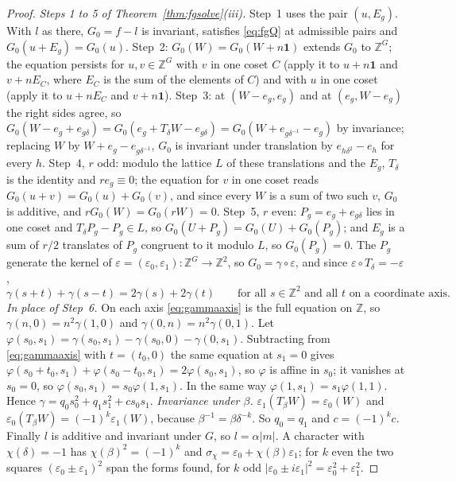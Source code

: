 \begin{proof}
\emph{Steps 1 to 5 of Theorem~\ref{thm:fgsolve}(iii).} Step~1 uses the pair $(u,E_g)$. With $l$ as there, $G_0=f-l$ is invariant, satisfies \eqref{eq:fgQ} at admissible pairs and $G_0(u+E_g)=G_0(u)$. Step~2: $G_0(W)=G_0(W+n\mathbf{1})$ extends $G_0$ to $\mathbb{Z}^{G}$; the equation persists for $u,v\in\mathbb{Z}^{G}$ with $v$ in one coset $C$ (apply it to $u+n\mathbf{1}$ and $v+nE_C$, where $E_C$ is the sum of the elements of $C$) and with $u$ in one coset (apply it to $u+nE_C$ and $v+n\mathbf{1}$). Step~3: at $(W-e_g,e_g)$ and at $(e_g,W-e_g)$ the right sides agree, so $G_0(W-e_g+e_{g\delta})=G_0(e_g+T_\delta W-e_{g\delta})=G_0(W+e_{g\delta^{-1}}-e_g)$ by invariance; replacing $W$ by $W+e_g-e_{g\delta^{-1}}$, $G_0$ is invariant under translation by $e_{h\delta^{2}}-e_h$ for every $h$. Step~4, $r$ odd: modulo the lattice $L$ of these translations and the $E_g$, $T_\delta$ is the identity and $re_g\equiv0$; the equation for $v$ in one coset reads $G_0(u+v)=G_0(u)+G_0(v)$, and since every $W$ is a sum of two such $v$, $G_0$ is additive, and $rG_0(W)=G_0(rW)=0$. Step~5, $r$ even: $P_g=e_g+e_{g\delta}$ lies in one coset and $T_\delta P_g-P_g\in L$, so $G_0(U+P_g)=G_0(U)+G_0(P_g)$; and $E_g$ is a sum of $r/2$ translates of $P_g$ congruent to it modulo $L$, so $G_0(P_g)=0$. The $P_g$ generate the kernel of $\varepsilon=(\varepsilon_0,\varepsilon_1)\colon\mathbb{Z}^{G}\to\mathbb{Z}^{2}$, so $G_0=\gamma\circ\varepsilon$, and since $\varepsilon\circ T_\delta=-\varepsilon$,
\begin{equation}\label{eq:gammaaxis}
\gamma(s+t)+\gamma(s-t)=2\gamma(s)+2\gamma(t)\qquad\text{for all }s\in\mathbb{Z}^{2}\text{ and all }t\text{ on a coordinate axis.}
\end{equation}
\emph{In place of Step~6.} On each axis \eqref{eq:gammaaxis} is the full equation on $\mathbb{Z}$, so $\gamma(n,0)=n^{2}\gamma(1,0)$ and $\gamma(0,n)=n^{2}\gamma(0,1)$. Let $\varphi(s_0,s_1)=\gamma(s_0,s_1)-\gamma(s_0,0)-\gamma(0,s_1)$. Subtracting from \eqref{eq:gammaaxis} with $t=(t_0,0)$ the same equation at $s_1=0$ gives $\varphi(s_0+t_0,s_1)+\varphi(s_0-t_0,s_1)=2\varphi(s_0,s_1)$, so $\varphi$ is affine in $s_0$; it vanishes at $s_0=0$, so $\varphi(s_0,s_1)=s_0\varphi(1,s_1)$. In the same way $\varphi(1,s_1)=s_1\varphi(1,1)$. Hence $\gamma=q_0s_0^{2}+q_1s_1^{2}+cs_0s_1$.
\emph{Invariance under $\beta$.} $\varepsilon_1(T_\beta W)=\varepsilon_0(W)$ and $\varepsilon_0(T_\beta W)=(-1)^{k}\varepsilon_1(W)$, because $\beta^{-1}=\beta\delta^{-k}$. So $q_0=q_1$ and $c=(-1)^{k}c$. Finally $l$ is additive and invariant under $G$, so $l=\alpha|m|$. A character with $\chi(\delta)=-1$ has $\chi(\beta)^{2}=(-1)^{k}$ and $\sigma_\chi=\varepsilon_0+\chi(\beta)\varepsilon_1$; for $k$ even the two squares $(\varepsilon_0\pm\varepsilon_1)^{2}$ span the forms found, for $k$ odd $|\varepsilon_0\pm i\varepsilon_1|^{2}=\varepsilon_0^{2}+\varepsilon_1^{2}$.
\end{proof}

